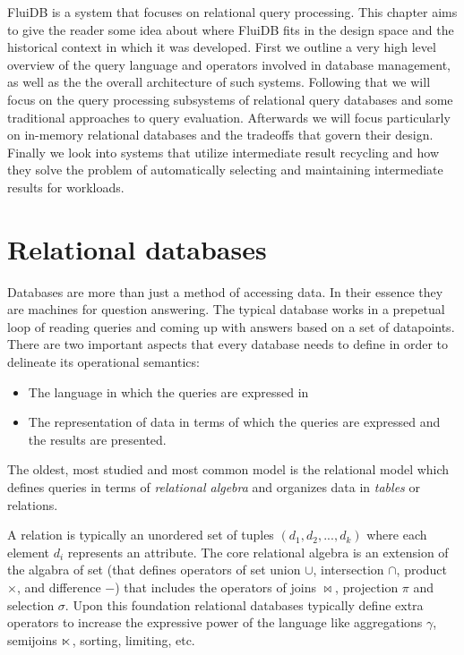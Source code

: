 
FluiDB is a system that focuses on relational query processing. This
chapter aims to give the reader some idea about where FluiDB fits in
the design space and the historical context in which it was developed.
First we outline a very high level overview of the query language and
operators involved in database management, as well as the the overall
architecture of such systems. Following that we will focus on the
query processing subsystems of relational query databases and some
traditional approaches to query evaluation. Afterwards we will focus
particularly on in-memory relational databases and the tradeoffs that
govern their design. Finally we look into systems that utilize
intermediate result recycling and how they solve the problem of
automatically selecting and maintaining intermediate results for
workloads.

\section{Relational databases}
\label{sec:org5af5e27}
Databases are more than just a method of accessing data. In their
essence they are machines for question answering. The typical database
works in a prepetual loop of reading queries and coming up with
answers based on a set of datapoints. There are two important aspects
that every database needs to define in order to delineate its
operational semantics:

\begin{itemize}
\item The language in which the queries are expressed in
\item The representation of data in terms of which the queries are
expressed and the results are presented.
\end{itemize}

The oldest, most studied and most common model is the relational model
which defines queries in terms of \emph{relational algebra} and organizes
data in \emph{tables} or relations.

A relation is typically an unordered set of tuples
\((d_1,d_2,...,d_k)\) where each element \(d_i\) represents an
attribute. The core relational algebra is an extension of the algabra
of set (that defines operators of set union \(\cup\), intersection
\(\cap\), product \(\times\), and difference \(-\)) that includes the
operators of joins \(\Join\), projection \(\pi\) and selection
\(\sigma\). Upon this foundation relational databases typically define
extra operators to increase the expressive power of the language like
aggregations \(\gamma\), semijoins \(\ltimes\), sorting, limiting, etc.

